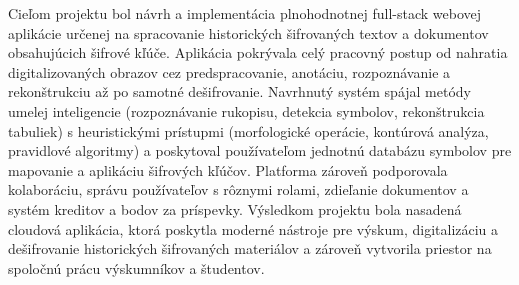 Cieľom projektu bol návrh a implementácia plnohodnotnej full-stack webovej aplikácie určenej na spracovanie historických šifrovaných textov a dokumentov obsahujúcich šifrové kľúče. Aplikácia pokrývala celý pracovný postup od nahratia digitalizovaných obrazov cez predspracovanie, anotáciu, rozpoznávanie a rekonštrukciu až po samotné dešifrovanie. Navrhnutý systém spájal metódy umelej inteligencie (rozpoznávanie rukopisu, detekcia symbolov, rekonštrukcia tabuliek) s heuristickými prístupmi (morfologické operácie, kontúrová analýza, pravidlové algoritmy) a poskytoval používateľom jednotnú databázu symbolov pre mapovanie a aplikáciu šifrových kľúčov. Platforma zároveň podporovala kolaboráciu, správu používateľov s rôznymi rolami, zdieľanie dokumentov a systém kreditov a bodov za príspevky. Výsledkom projektu bola nasadená cloudová aplikácia, ktorá poskytla moderné nástroje pre výskum, digitalizáciu a dešifrovanie historických šifrovaných materiálov a zároveň vytvorila priestor na spoločnú prácu výskumníkov a študentov.